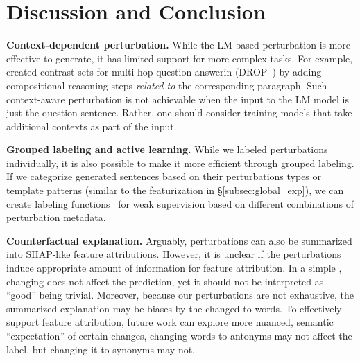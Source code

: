 \section{Discussion and Conclusion}
\label{sec:discuss} 


\textbf{Context-dependent perturbation.}
While the LM-based perturbation is more effective to generate, it has limited support for more complex tasks.
For example, \citet{gardner2020contrast} created contrast sets for multi-hop question answerin (DROP~\cite{}) by adding compositional reasoning steps \emph{related to} the corresponding paragraph.
Such context-aware perturbation is not achievable when the input to the LM model is just the question sentence.
Rather, one should consider training models that take additional contexts as part of the input.

\textbf{Grouped labeling and active learning.}
While we labeled perturbations individually, it is also possible to make it more efficient through grouped labeling. 
If we categorize generated sentences based on their perturbations types or template patterns (similar to the featurization in \S\ref{subsec:global_exp}), we can create labeling functions~\cite{ratner2017snorkel} for weak supervision based on different combinations of perturbation metadata.


\textbf{Counterfactual explanation.}
Arguably, perturbations can also be summarized into SHAP-like feature attributions.
However, it is unclear if the perturbations induce appropriate amount of information for feature attribution.
In a simple , changing  does not affect the prediction, yet it should not be interpreted as ``good'' being trivial.
Moreover, because our perturbations are not exhaustive, the summarized explanation may be biases by the changed-to words.
To effectively support feature attribution, future work can explore more nuanced, semantic ``expectation'' of certain changes, \ie changing words to antonyms may not affect the label, but changing it to synonyms may not.



